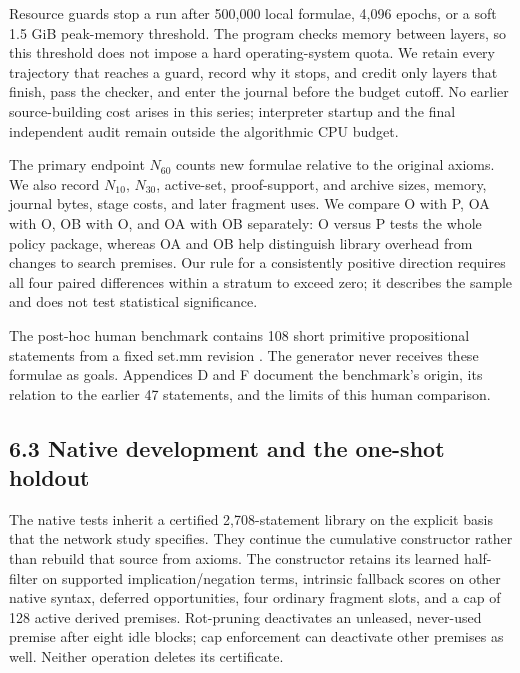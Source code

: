 \documentclass[pdflatex,sn-basic,Numbered]{sn-jnl}
\begin{document}
Resource guards stop a run after 500,000 local formulae, 4,096 epochs, or a soft 1.5 GiB peak-memory threshold. The program checks memory between layers, so this threshold does not impose a hard operating-system quota. We retain every trajectory that reaches a guard, record why it stops, and credit only layers that finish, pass the checker, and enter the journal before the budget cutoff. No earlier source-building cost arises in this series; interpreter startup and the final independent audit remain outside the algorithmic CPU budget.

The primary endpoint \(N_{60}\) counts new formulae relative to the original axioms. We also record \(N_{10}\text{,}\) \(N_{30}\), active-set, proof-support, and archive sizes, memory, journal bytes, stage costs, and later fragment uses. We compare O with P, OA with O, OB with O, and OA with OB separately: O versus P tests the whole policy package, whereas OA and OB help distinguish library overhead from changes to search premises. Our rule for a consistently positive direction requires all four paired differences within a stratum to exceed zero; it describes the sample and does not test statistical significance.

The post-hoc human benchmark contains 108 short primitive propositional statements from a fixed set.mm revision \citep{MetamathSetMMPinned}. The generator never receives these formulae as goals. Appendices D and F document the benchmark's origin, its relation to the earlier 47 statements, and the limits of this human comparison.

\subsection*{6.3 Native development and the one-shot holdout}\label{native-development-and-the-one-shot-holdout}

The native tests inherit a certified 2,708-statement library on the explicit basis that the network study specifies. They continue the cumulative constructor rather than rebuild that source from axioms. The constructor retains its learned half-filter on supported implication/negation terms, intrinsic fallback scores on other native syntax, deferred opportunities, four ordinary fragment slots, and a cap of 128 active derived premises. Rot-pruning deactivates an unleased, never-used premise after eight idle blocks; cap enforcement can deactivate other premises as well. Neither operation deletes its certificate.
\end{document}
